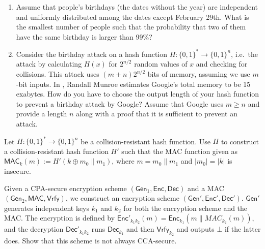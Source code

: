 \documentclass[a4paper,10pt,landscape,twocolumn]{scrartcl}
\begin{document}
\begin{exercise}
\begin{enumerate}
	\item Assume that people's birthdays (the dates without the year) are independent and uniformly distributed among the dates except February 29th. What is the smallest number of people such that the probability that two of them have the same birthday is larger than 99\%?
	\item Consider the birthday attack on a hash function $H: \{0,1\}^*\to\{0,1\}^n$, i.e.\ the attack by calculating $H(x)$ for $2^{n/2}$ random values of $x$ and checking for collisions. This attack uses $(m+n)2^{n/2}$ bits of memory, assuming we use $m$-bit inputs. In , Randall Munroe estimates Google's total memory to be 15 exabytes.  How do you have to choose the output length of your hash function to prevent a birthday attack by Google? Assume that Google uses $m\ge n$ and provide a length $n$ along with a proof that it is sufficient to prevent an attack.
\end{enumerate}
\end{exercise}



\begin{exercise}[HMAC?]
  Let $H: \{0,1\}^*\to \{0,1\}^n$ be a collision-resistant hash function. Use $H$ to construct a collision-resistant hash function $H'$ such that the MAC function given as $\mathsf{MAC}_k(m) := H'(k\oplus m_0\|m_1)$, where $m=m_0\|m_1$ and $|m_0|=|k|$ is insecure.
\end{exercise}

\begin{exercise}

Given a CPA-secure encryption scheme $(\mathsf{Gen}_1, \mathsf{Enc}, \mathsf{Dec})$ and a MAC $(\mathsf{Gen}_2, \mathsf{MAC}, \mathsf{Vrfy})$, we construct an encryption scheme $(\mathsf{Gen}', \mathsf{Enc}', \mathsf{Dec}')$. $\mathsf{Gen}'$ generates independent keys $k_1$ and $k_2$ for both the encryption scheme and the MAC. The encryption is defined by $\mathsf{Enc}'_{k_1k_2}(m)=\mathsf{Enc}_{k_1}(m\|MAC_{k_2}(m))$, and the decryption $\mathsf{Dec}'_{k_1k_2}$ runs $\mathsf{Dec}_{k_1}$ and then $\mathsf{Vrfy}_{k_2}$ and outputs $\bot$ if the latter does. Show that this scheme is not always CCA-secure.


\end{exercise}
\end{document}
